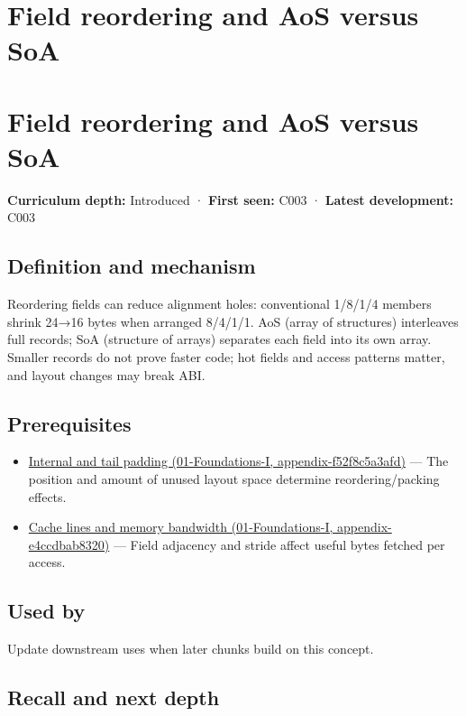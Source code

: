 \hypertarget{appendix-5522ad176ca0}{}
\section*{Field reordering and AoS versus SoA}
\section{Field reordering and AoS versus SoA}\label{field-reordering-and-aos-versus-soa}

\textbf{Curriculum depth:} Introduced · \textbf{First seen:} C003 · \textbf{Latest development:} C003

\subsection{Definition and mechanism}\label{definition-and-mechanism}

Reordering fields can reduce alignment holes: conventional 1/8/1/4 members shrink 24→16 bytes when arranged 8/4/1/1. AoS (array of structures) interleaves full records; SoA (structure of arrays) separates each field into its own array. Smaller records do not prove faster code; hot fields and access patterns matter, and layout changes may break ABI.

\subsection{Prerequisites}\label{prerequisites}

\begin{itemize}
\tightlist
\item
  \href{}{Internal and tail padding (01-Foundations-I, appendix-f52f8c5a3afd)} --- The position and amount of unused layout space determine reordering/packing effects.
\item
  \href{}{Cache lines and memory bandwidth (01-Foundations-I, appendix-e4ccdbab8320)} --- Field adjacency and stride affect useful bytes fetched per access.
\end{itemize}

\subsection{Used by}\label{used-by}

Update downstream uses when later chunks build on this concept.

\subsection{Recall and next depth}\label{recall-and-next-depth}

